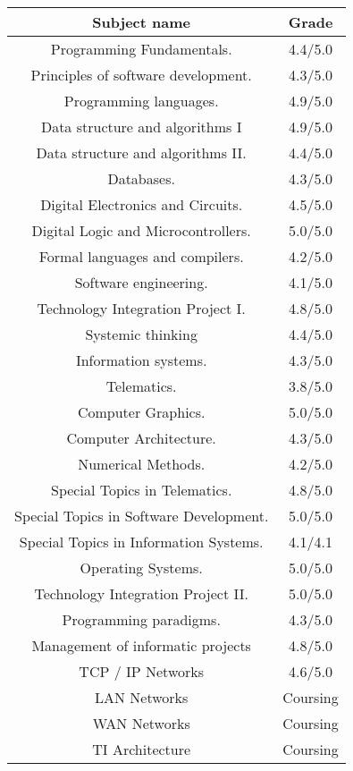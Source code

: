\documentclass[a4paper,10pt]{article} %
\begin{document}
\begin {center}
\begin{tabular}{| c | c |}
 \hline
 \textbf{Subject name} & \textbf{Grade}\\ \hline
Programming Fundamentals. & 4.4/5.0\\
Principles of software development. & 4.3/5.0\\
Programming languages.  & 4.9/5.0\\
Data structure and algorithms I  & 4.9/5.0\\
Data structure and algorithms II. & 4.4/5.0\\
Databases.  & 4.3/5.0\\
Digital Electronics and Circuits.  & 4.5/5.0\\
Digital Logic and Microcontrollers.  & 5.0/5.0\\
Formal languages and compilers.  & 4.2/5.0\\
Software engineering.  & 4.1/5.0\\
Technology Integration Project I.  & 4.8/5.0\\
Systemic thinking  & 4.4/5.0\\
Information systems.  & 4.3/5.0\\
Telematics. & 3.8/5.0\\
Computer Graphics.  & 5.0/5.0\\
Computer Architecture. & 4.3/5.0\\
Numerical Methods. & 4.2/5.0\\
Special Topics in Telematics. & 4.8/5.0\\
Special Topics in Software Development. & 5.0/5.0\\
Special Topics in Information Systems. & 4.1/4.1\\
Operating Systems. & 5.0/5.0\\
Technology Integration Project II. & 5.0/5.0\\
Programming paradigms. & 4.3/5.0\\
Management of informatic projects & 4.8/5.0\\
TCP / IP Networks & 4.6/5.0\\
LAN Networks & Coursing\\
WAN Networks & Coursing\\
TI Architecture & Coursing\\
\hline
\end{tabular}
\end{center}
\end{document}
